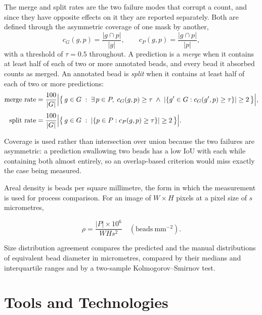 The merge and split rates are the two failure modes that corrupt a
count, and since they have opposite effects on it they are reported separately.
Both are defined through the asymmetric coverage of one mask by another,
%
\begin{equation}
    c_{G}(g, p) = \frac{|g \cap p|}{|g|},
    \qquad
    c_{P}(g, p) = \frac{|g \cap p|}{|p|},
    \label{eq:coverage}
\end{equation}
%
with a threshold of $\tau = 0.5$ throughout. A prediction is a \emph{merge} when it
contains at least half of each of two or more annotated beads, and every bead it
absorbed counts as merged. An annotated bead is \emph{split} when it contains at
least half of each of two or more predictions:
%
\begin{align}
    \mathrm{merge\ rate} &= \frac{100}{|G|}
        \Bigl|\bigl\{\, g \in G \;:\; \exists\, p \in P,\;
        c_{G}(g,p) \geq \tau \;\wedge\;
        |\{g' \in G : c_{G}(g',p) \geq \tau\}| \geq 2 \,\bigr\}\Bigr|,
    \label{eq:merge_rate} \\[4pt]
    \mathrm{split\ rate} &= \frac{100}{|G|}
        \Bigl|\bigl\{\, g \in G \;:\;
        |\{p \in P : c_{P}(g,p) \geq \tau\}| \geq 2 \,\bigr\}\Bigr|.
    \label{eq:split_rate}
\end{align}

%
Coverage is used rather than intersection over union because the two failures are
asymmetric: a prediction swallowing two beads has a low $\mathrm{IoU}$ with each
while containing both almost entirely, so an overlap-based criterion would miss
exactly the case being measured.

Areal density is beads per square millimetre, the form in which the
measurement is used for process comparison. For an image of $W \times H$
pixels at a pixel size of $s$ micrometres,
%

\begin{equation}
    \rho = \frac{|P| \times 10^{6}}{W H s^{2}}
    \quad (\mathrm{beads\ mm^{-2}}).
    \label{eq:density}
\end{equation}

Size distribution agreement compares the predicted and the manual distributions of
equivalent bead diameter in micrometres, compared by their medians and interquartile
ranges and by a two-sample Kolmogorov--Smirnov test.

\section{Tools and Technologies}

